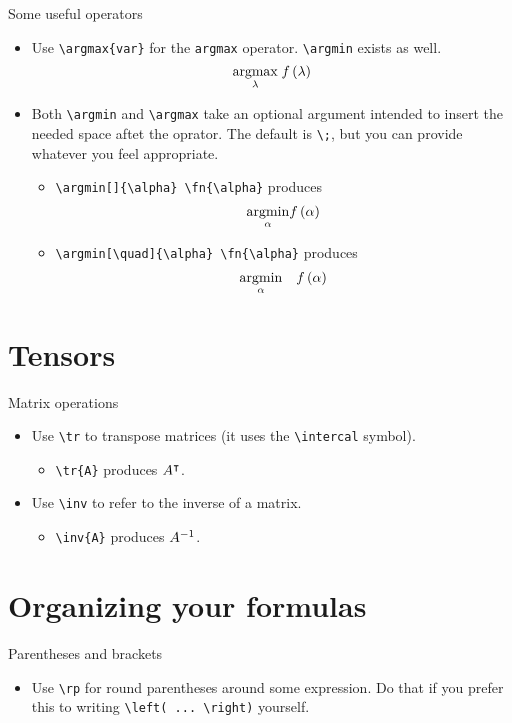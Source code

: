 \documentclass{beamer}
\begin{document}
    \begin{frame}[fragile]{Some useful operators}
        \begin{itemize}
            \item Use \verb!\argmax{var}! for the {\tt argmax} operator. \verb!\argmin! exists as well.
                $$\argmax{\lambda} \fn{\lambda}$$
            \item Both \verb!\argmin! and \verb!\argmax! take an optional argument intended to insert the needed space aftet the oprator. The default is \verb!\;!, but you can provide whatever you feel appropriate.
            \begin{itemize}
                \item \verb!\argmin[]{\alpha} \fn{\alpha}! produces
                    $$ \argmin[]{\alpha} \fn{\alpha} $$
                \item \verb!\argmin[\quad]{\alpha} \fn{\alpha}! produces
                    $$ \argmin[\quad]{\alpha} \fn{\alpha} $$
            \end{itemize}
            
        \end{itemize}
    \end{frame}

\section{Tensors}
\label{sec:tensors}

    \begin{frame}[fragile]{Matrix operations}
        \begin{itemize}
            \item Use \verb!\tr! to \alert{transpose} matrices (it uses the \verb!\intercal! symbol).
                \begin{itemize}
                    \item \verb!\tr{A}! produces $\tr{A}$.
                \end{itemize}
            \item Use \verb!\inv! to refer to the \alert{inverse} of a matrix.
            \begin{itemize}
                \item \verb!\inv{A}! produces $\inv{A}$.
            \end{itemize}
        \end{itemize}
    \end{frame}

\section{Organizing your formulas}
\label{sec:org}

    \begin{frame}[fragile]{Parentheses and brackets}
        \begin{itemize}
            \item Use \verb!\rp! for \alert{round parentheses} around some expression.
            Do that if you prefer this to writing \verb!\left( ... \right)! yourself.
        \end{itemize}
    \end{frame}
\end{document}
